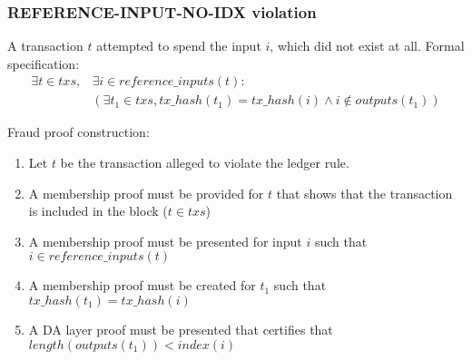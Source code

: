 \documentclass[../midgard.tex]{subfiles}
\begin{document}
\subsubsection{REFERENCE-INPUT-NO-IDX violation}
\label{violation:REFERENCE-INPUT-NO-IDX}
A transaction $t$ attempted to spend the input $i$, which did not exist at all.
Formal specification:
\begin{equation*}
\begin{split}
    \exists t \in txs, &\exists i \in reference\_inputs(t): \\
    &( \exists t_1 \in txs, tx\_hash(t_1) = tx\_hash(i) \land i \notin outputs(t_1) )
\end{split}
\end{equation*}

Fraud proof construction:
\begin{enumerate}
  \item Let $t$ be the transaction alleged to violate the ledger rule. 
  \item A membership proof must be provided for $t$ that shows that the transaction is included in the block ($t \in txs$)
  \item A membership proof must be presented for input $i$ such that $i \in reference\_inputs(t)$
  \item A membership proof must be created for $t_1$ such that $tx\_hash(t_1) = tx\_hash(i)$
  \item A DA layer proof must be presented that certifies that $length(outputs(t_1)) < index(i)$
\end{enumerate}







\end{document}
